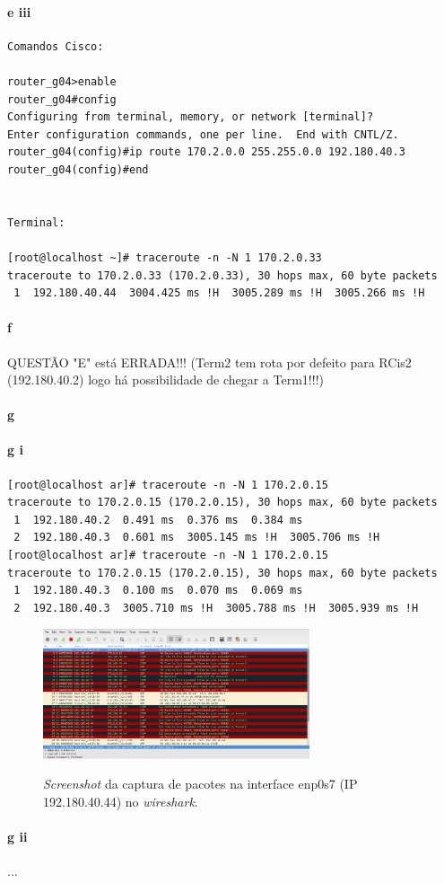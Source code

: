 \paragraph{e iii}
\begin{verbatim}
Comandos Cisco:

router_g04>enable
router_g04#config
Configuring from terminal, memory, or network [terminal]? 
Enter configuration commands, one per line.  End with CNTL/Z.
router_g04(config)#ip route 170.2.0.0 255.255.0.0 192.180.40.3 
router_g04(config)#end


Terminal:

[root@localhost ~]# traceroute -n -N 1 170.2.0.33
traceroute to 170.2.0.33 (170.2.0.33), 30 hops max, 60 byte packets
 1  192.180.40.44  3004.425 ms !H  3005.289 ms !H  3005.266 ms !H                                                 
\end{verbatim}

\paragraph{f}
QUESTÃO "E" está ERRADA!!! (Term2 tem rota por defeito para RCis2 (192.180.40.2) logo há possibilidade de chegar a Term1!!!)

\paragraph{g}

\paragraph{g i}
\begin{verbatim}
[root@localhost ar]# traceroute -n -N 1 170.2.0.15
traceroute to 170.2.0.15 (170.2.0.15), 30 hops max, 60 byte packets
 1  192.180.40.2  0.491 ms  0.376 ms  0.384 ms
 2  192.180.40.3  0.601 ms  3005.145 ms !H  3005.706 ms !H
[root@localhost ar]# traceroute -n -N 1 170.2.0.15
traceroute to 170.2.0.15 (170.2.0.15), 30 hops max, 60 byte packets
 1  192.180.40.3  0.100 ms  0.070 ms  0.069 ms
 2  192.180.40.3  3005.710 ms !H  3005.788 ms !H  3005.939 ms !H
\end{verbatim}

\begin{figure}[h]
\centering
\includegraphics[width=0.7\textwidth]{1_g1_screenshot.png}
\label{fig:wireshark-enp0s7}
\caption{\emph{Screenshot} da captura de pacotes na interface enp0s7 (IP 192.180.40.44) no \emph{wireshark}.}
\end{figure}

\paragraph{g ii}
...